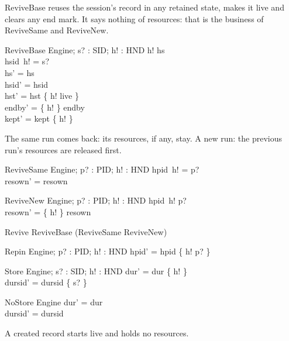 \documentclass[a4paper,10pt,fleqn]{article}
\begin{document}
ReviveBase reuses the session's record in any retained state, makes it live
and clears any end mark.  It says nothing of resources: that is the business
of ReviveSame and ReviveNew.

\begin{schema}{ReviveBase}
  \Delta Engine; s? : SID; h! : HND
\where
  h! \in hs \\
  hsid~h! = s? \\
  hs' = hs \\
  hsid' = hsid \\
  hst' = hst \oplus \{ h! \mapsto live \} \\
  endby' = \{ h! \} \ndres endby \\
  kept' = kept \setminus \{ h! \}
\end{schema}

The same run comes back: its resources, if any, stay.  A new run: the
previous run's resources are released first.

\begin{schema}{ReviveSame}
  \Delta Engine; p? : PID; h! : HND
\where
  hpid~h! = p? \\
  resown' = resown
\end{schema}

\begin{schema}{ReviveNew}
  \Delta Engine; p? : PID; h! : HND
\where
  hpid~h! \neq p? \\
  resown' = \{ h! \} \ndres resown
\end{schema}

\begin{zed}
  Revive  ReviveBase \land (ReviveSame \lor ReviveNew)
\end{zed}

\begin{schema}{Repin}
  \Delta Engine; p? : PID; h! : HND
\where
  hpid' = hpid \oplus \{ h! \mapsto p? \}
\end{schema}

\begin{schema}{Store}
  \Delta Engine; s? : SID; h! : HND
\where
  dur' = dur \cup \{ h! \} \\
  dursid' = dursid \cup \{ s? \}
\end{schema}

\begin{schema}{NoStore}
  \Delta Engine
\where
  dur' = dur \\
  dursid' = dursid
\end{schema}

A created record starts live and holds no resources.
\end{document}
